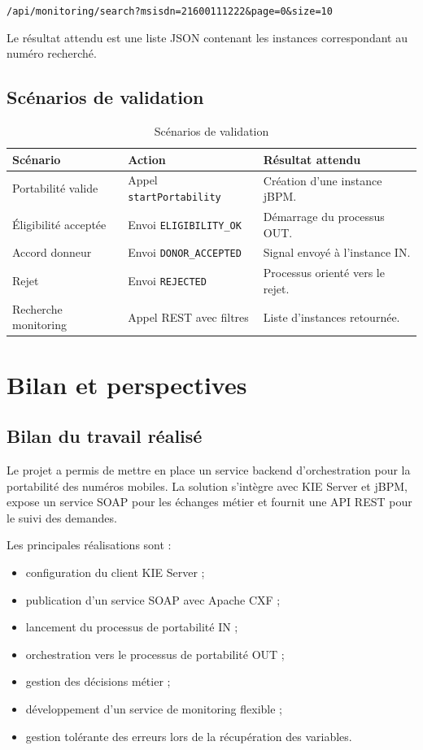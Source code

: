 \documentclass[12pt,a4paper]{report}
\begin{document}
\begin{center}
\texttt{/api/monitoring/search?msisdn=21600111222\&page=0\&size=10}
\end{center}

Le résultat attendu est une liste JSON contenant les instances correspondant au numéro recherché.

\section{Scénarios de validation}
\begin{table}[h]
    \centering
    \begin{tabular}{p{4cm}p{5cm}p{4cm}}
        \toprule
        \textbf{Scénario} & \textbf{Action} & \textbf{Résultat attendu} \\
        \midrule
        Portabilité valide & Appel \texttt{startPortability} & Création d'une instance jBPM. \\
        Éligibilité acceptée & Envoi \texttt{ELIGIBILITY\_OK} & Démarrage du processus OUT. \\
        Accord donneur & Envoi \texttt{DONOR\_ACCEPTED} & Signal envoyé à l'instance IN. \\
        Rejet & Envoi \texttt{REJECTED} & Processus orienté vers le rejet. \\
        Recherche monitoring & Appel REST avec filtres & Liste d'instances retournée. \\
        \bottomrule
    \end{tabular}
    \caption{Scénarios de validation}
\end{table}

\chapter{Bilan et perspectives}
\section{Bilan du travail réalisé}
Le projet a permis de mettre en place un service backend d'orchestration pour la portabilité des numéros mobiles. La solution s'intègre avec KIE Server et jBPM, expose un service SOAP pour les échanges métier et fournit une API REST pour le suivi des demandes.

Les principales réalisations sont :
\begin{itemize}
    \item configuration du client KIE Server ;
    \item publication d'un service SOAP avec Apache CXF ;
    \item lancement du processus de portabilité IN ;
    \item orchestration vers le processus de portabilité OUT ;
    \item gestion des décisions métier ;
    \item développement d'un service de monitoring flexible ;
    \item gestion tolérante des erreurs lors de la récupération des variables.
\end{itemize}
\end{document}
